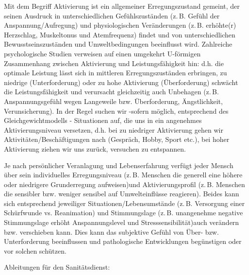 \Text
{{\TxBeschreibung}}%
{%
Mit dem Begriff Aktivierung ist ein allgemeiner Erregungszustand gemeint, der seinen Ausdruck in unterschiedlichen Gefühlszuständen (z.\,B. Gefühl der Anspannung/Aufregung) und physiologischen Veränderungen (z.\,B. erhöhte(r) Herzschlag, Muskeltonus und Atemfrequenz) findet und von unterschiedlichen Bewusstseinszuständen und Umweltbedingungen beeinflusst wird. Zahlreiche psychologische Studien verweisen auf einen umgekehrt U-förmigen Zusammenhang zwischen Aktivierung und Leistungsfähigkeit hin: d.h. die optimale Leistung lässt sich in mittleren Erregungszuständen erbringen, zu niedrige (Unterforderung) oder zu hohe Aktivierung (Überforderung) schwächt die Leistungsfähigkeit und verursacht gleichzeitig auch Unbehagen (z.\,B. Anspannungsgefühl wegen Langeweile bzw. Überforderung, Ängstlichkeit, Verunsicherung). In der Regel suchen wir -sofern möglich, entsprechend des Gleichgewichtmodells - Situationen auf, die uns in ein angenehmes Aktivierungsniveau versetzen, d.h. bei zu niedriger Aktivierung gehen wir Aktivitäten/Beschäftigungen nach (Gespräch, Hobby, Sport etc.), bei hoher Aktivierung ziehen wir uns zurück, versuchen zu entspannen.

Je nach persönlicher Veranlagung und Lebenserfahrung verfügt jeder Mensch über sein individuelles Erregungsniveau (z.\,B. Menschen die generell eine höhere oder niedrigere Grunderregung aufweisen)und Aktivierungsprofil (z.\,B. Menschen die sensibler bzw. weniger sensibel auf Umwelteinflüsse reagieren). Beides kann sich entsprechend jeweiliger Situationen/Lebensumstände (z.\,B. Versorgung einer Schürfwunde vs. Reanimation)   und
Stimmungslage (z.\,B. unangenehme negative Stimmungslage erhöht Anspannungslevel und Stresssensibilität)auch verändern bzw. verschieben kann. Dies kann das subjektive Gefühl von Über- bzw. Unterforderung beeinflussen und pathologische Entwicklungen begünstigen oder vor solchen schützen.



Ableitungen für den Sanitätsdienst: 

}

